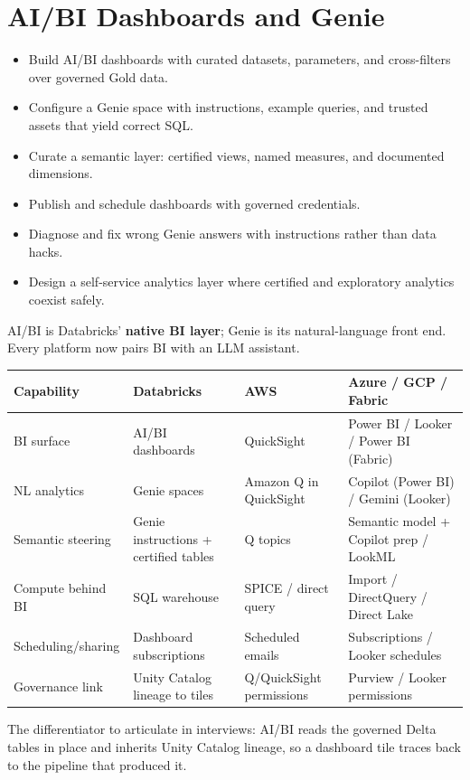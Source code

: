 \chapter{AI/BI Dashboards and Genie}
%
%
\begin{objectives}
\begin{itemize}
    \item Build AI/BI dashboards with curated datasets, parameters, and cross-filters over governed Gold data.
    \item Configure a Genie space with instructions, example queries, and trusted assets that yield correct SQL.
    \item Curate a semantic layer: certified views, named measures, and documented dimensions.
    \item Publish and schedule dashboards with governed credentials.
    \item Diagnose and fix wrong Genie answers with instructions rather than data hacks.
    \item Design a self-service analytics layer where certified and exploratory analytics coexist safely.
\end{itemize}
\end{objectives}

\begin{crosscloud}
AI/BI is Databricks' \textbf{native BI layer}; Genie is its natural-language front end. Every
platform now pairs BI with an LLM assistant.

\vspace{2mm}
{\footnotesize
\begin{tabular}{@{}p{3.0cm}p{3.4cm}p{3.2cm}p{3.2cm}@{}}
\toprule
\textbf{Capability} & \textbf{Databricks} & \textbf{AWS} & \textbf{Azure / GCP / Fabric} \\
\midrule
BI surface & AI/BI dashboards & QuickSight & Power BI / Looker / Power BI (Fabric) \\
NL analytics & Genie spaces & Amazon Q in QuickSight & Copilot (Power BI) / Gemini (Looker) \\
Semantic steering & Genie instructions + certified tables & Q topics & Semantic model + Copilot prep / LookML \\
Compute behind BI & SQL warehouse & SPICE / direct query & Import / DirectQuery / Direct Lake \\
Scheduling/sharing & Dashboard subscriptions & Scheduled emails & Subscriptions / Looker schedules \\
Governance link & Unity Catalog lineage to tiles & Q/QuickSight permissions & Purview / Looker permissions \\
\bottomrule
\end{tabular}}

\vspace{1mm}
The differentiator to articulate in interviews: AI/BI reads the governed Delta tables in place and
inherits Unity Catalog lineage, so a dashboard tile traces back to the pipeline that produced it.
\end{crosscloud}

